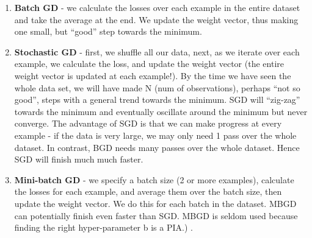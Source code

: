 \documentclass[11pt]{article}
\begin{document}
\begin{enumerate}
\def\labelenumi{\arabic{enumi})}
\item
  \textbf{Batch GD} - we calculate the losses over each example in the
  entire dataset and take the average at the end. We update the weight
  vector, thus making one small, but ``good'' step towards the minimum.
\item
  \textbf{Stochastic GD} - first, we shuffle all our data, next, as we
  iterate over each example, we calculate the loss, and update the
  weight vector (the entire weight vector is updated at each example!).
  By the time we have seen the whole data set, we will have made N (num
  of observations), perhaps ``not so good'', steps with a general trend
  towards the minimum. SGD will ``zig-zag'' towards the minimum and
  eventually oscillate around the minimum but never converge. The
  advantage of SGD is that we can make progress at every example - if
  the data is very large, we may only need 1 pass over the whole
  dataset. In contrast, BGD needs many passes over the whole dataset.
  Hence SGD will finish much much faster.
\item
  \textbf{Mini-batch GD} - we specify a batch size (2 or more examples),
  calculate the losses for each example, and average them over the batch
  size, then update the weight vector. We do this for each batch in the
  dataset. MBGD can potentially finish even faster than SGD. MBGD is
  seldom used because finding the right hyper-parameter b is a PIA.) .
\end{enumerate}
\end{document}
